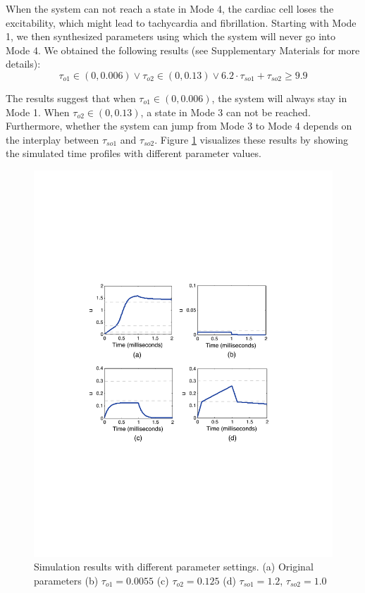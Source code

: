 When the system can not reach a state in Mode 4, the cardiac cell loses the excitability, which might lead to tachycardia and fibrillation. Starting with Mode 1, we then synthesized parameters using which the system will never go into Mode 4. We obtained the following results (see Supplementary Materials for more details):
$$\tau_{o1} \in (0,0.006)\vee \tau_{o2} \in (0,0.13)\vee 6.2 \cdot \tau_{so1} + \tau_{so2} \ge 9.9$$

The results suggest that when $\tau_{o1} \in (0, 0.006)$, the system will always stay in Mode 1. When $\tau_{o2} \in (0, 0.13)$, a state in Mode 3 can not be reached. Furthermore, whether the system can jump from Mode 3 to Mode 4 depends on the interplay between $\tau_{so1}$ and $\tau_{so2}$.  Figure \ref{cresults} visualizes these results by showing the simulated time profiles with different parameter values.



\begin{figure}[h]
\centering
\includegraphics[scale=0.6]{fig-cardiactraj2}
\caption{Simulation results with different parameter settings. (a) Original parameters (b) $\tau_{o1}=0.0055$ (c) $\tau_{o2} = 0.125$ (d) $\tau_{so1} =1.2$, $\tau_{so2} =1.0$ }
\label{cresults}
 \vspace{-0.7cm}
\end{figure}

